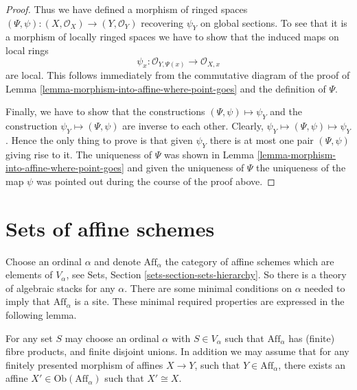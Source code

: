 \begin{proof}
\medskip\noindent
Thus we have defined a morphism of ringed spaces
$(\Psi, \psi) : (X, \mathcal{O}_X) \to (Y, \mathcal{O}_Y)$
recovering $\psi_Y$ on global sections. To see that it is
a morphism of locally ringed spaces we have to show that
the induced maps on local rings
$$
\psi_x : \mathcal{O}_{Y,\Psi(x)} \longrightarrow \mathcal{O}_{X, x}
$$
are local. This follows immediately from the commutative diagram
of the proof of Lemma \ref{lemma-morphism-into-affine-where-point-goes}
and the definition of $\Psi$.

\medskip\noindent
Finally, we have to show that the constructions
$(\Psi, \psi) \mapsto \psi_Y$ and the construction
$\psi_Y \mapsto (\Psi, \psi)$ are inverse to each other.
Clearly, $\psi_Y \mapsto (\Psi, \psi) \mapsto \psi_Y$.
Hence the only thing to prove is that given $\psi_Y$
there is at most one pair $(\Psi, \psi)$ giving rise
to it. The uniqueness of $\Psi$ was shown in Lemma
\ref{lemma-morphism-into-affine-where-point-goes} and
given the uniqueness of $\Psi$ the uniqueness of the
map $\psi$ was pointed out during the course of the proof
above.
\end{proof}


\section{Sets of affine schemes}
\label{section-sets-of-affines}

\noindent
Choose an ordinal $\alpha$ and denote $\text{Aff}_\alpha$ the
category of affine schemes which are elements of $V_\alpha$, see
Sets, Section \ref{sets-section-sets-hierarchy}. So there is a
theory of algebraic stacks for any $\alpha$. There are some minimal
conditions on $\alpha$ needed to imply that $\text{Aff}_\alpha$ is a site. 
These minimal required properties are expressed in the following lemma.

\begin{lemma}
\label{lemma-Aff-site}
For any set $S$ may choose an ordinal $\alpha$ with $S \in V_\alpha$ 
such that $\text{Aff}_\alpha$ has (finite) fibre products, and finite disjoint
unions. In addition we may assume that for any finitely presented morphism
of affines $X \to Y$, such that $Y \in \text{Aff}_\alpha$, there exists
an affine $X' \in \text{Ob}(\text{Aff}_\alpha)$ such that $X' \cong X$.
\end{lemma}

